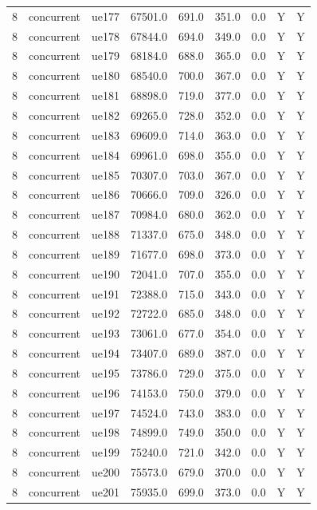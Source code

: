 \begin{table}[ht]
\begin{tabular}{|c|c|c|c|c|c|c|c|c|}
8 & concurrent & ue177 & 67501.0 & 691.0 & 351.0 & 0.0 & Y & Y \\
8 & concurrent & ue178 & 67844.0 & 694.0 & 349.0 & 0.0 & Y & Y \\
8 & concurrent & ue179 & 68184.0 & 688.0 & 365.0 & 0.0 & Y & Y \\
8 & concurrent & ue180 & 68540.0 & 700.0 & 367.0 & 0.0 & Y & Y \\
8 & concurrent & ue181 & 68898.0 & 719.0 & 377.0 & 0.0 & Y & Y \\
8 & concurrent & ue182 & 69265.0 & 728.0 & 352.0 & 0.0 & Y & Y \\
8 & concurrent & ue183 & 69609.0 & 714.0 & 363.0 & 0.0 & Y & Y \\
8 & concurrent & ue184 & 69961.0 & 698.0 & 355.0 & 0.0 & Y & Y \\
8 & concurrent & ue185 & 70307.0 & 703.0 & 367.0 & 0.0 & Y & Y \\
8 & concurrent & ue186 & 70666.0 & 709.0 & 326.0 & 0.0 & Y & Y \\
8 & concurrent & ue187 & 70984.0 & 680.0 & 362.0 & 0.0 & Y & Y \\
8 & concurrent & ue188 & 71337.0 & 675.0 & 348.0 & 0.0 & Y & Y \\
8 & concurrent & ue189 & 71677.0 & 698.0 & 373.0 & 0.0 & Y & Y \\
8 & concurrent & ue190 & 72041.0 & 707.0 & 355.0 & 0.0 & Y & Y \\
8 & concurrent & ue191 & 72388.0 & 715.0 & 343.0 & 0.0 & Y & Y \\
8 & concurrent & ue192 & 72722.0 & 685.0 & 348.0 & 0.0 & Y & Y \\
8 & concurrent & ue193 & 73061.0 & 677.0 & 354.0 & 0.0 & Y & Y \\
8 & concurrent & ue194 & 73407.0 & 689.0 & 387.0 & 0.0 & Y & Y \\
8 & concurrent & ue195 & 73786.0 & 729.0 & 375.0 & 0.0 & Y & Y \\
8 & concurrent & ue196 & 74153.0 & 750.0 & 379.0 & 0.0 & Y & Y \\
8 & concurrent & ue197 & 74524.0 & 743.0 & 383.0 & 0.0 & Y & Y \\
8 & concurrent & ue198 & 74899.0 & 749.0 & 350.0 & 0.0 & Y & Y \\
8 & concurrent & ue199 & 75240.0 & 721.0 & 342.0 & 0.0 & Y & Y \\
8 & concurrent & ue200 & 75573.0 & 679.0 & 370.0 & 0.0 & Y & Y \\
8 & concurrent & ue201 & 75935.0 & 699.0 & 373.0 & 0.0 & Y & Y \\

\end{tabular}
\end{table}
